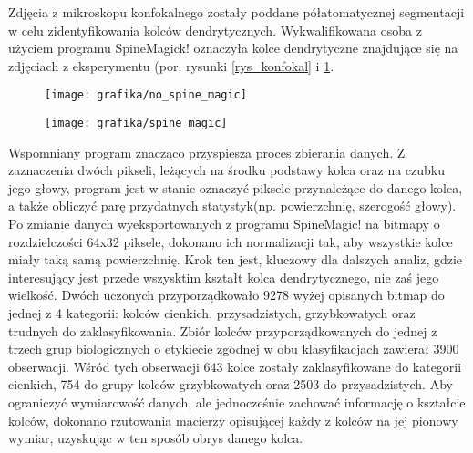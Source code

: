 \documentclass{article}
\begin{document}
Zdjęcia z mikroskopu konfokalnego zostały poddane półatomatycznej segmentacji w celu zidentyfikowania kolców dendrytycznych. 
Wykwalifikowana osoba z użyciem programu SpineMagick! oznaczyła kolce dendrytyczne znajdujące się na zdjęciach z eksperymentu (por. rysunki \ref{rys_konfokal} i \ref{rys_spine_magick}.
\begin{figure}
\centering
\begin{minipage}{.4\textwidth}
  \centering
  \texttt{[image: grafika/no\_spine\_magic]}
  \label{rys_konfokal}
\end{minipage}%
\hspace{1cm}
\begin{minipage}{.4\textwidth}
  \centering
  \texttt{[image: grafika/spine\_magic]}
  \label{rys_spine_magick}
\end{minipage}
\end{figure}
Wspomniany program znacząco przyspiesza proces zbierania danych.
Z zaznaczenia dwóch pikseli, leżących na środku podstawy kolca oraz na czubku jego głowy, program jest w stanie oznaczyć piksele przynależące do danego kolca, a także obliczyć parę przydatnych statystyk(np. powierzchnię, szerogość głowy).
Po zmianie danych wyeksportowanych z programu SpineMagic! na bitmapy o rozdzielczości 64x32 piksele, dokonano ich normalizacji tak, aby wszystkie kolce miały taką samą powierzchnię.
Krok ten jest, kluczowy dla dalszych analiz, gdzie interesujący jest przede wszysktim kształt kolca dendrytycznego, nie zaś jego wielkość.
Dwóch uczonych przyporządkowało 9278 wyżej opisanych bitmap do jednej z 4 kategorii: kolców cienkich, przysadzistych, grzybkowatych oraz trudnych do zaklasyfikowania.
Zbiór kolców przyporządkowanych do jednej z trzech grup biologicznych o etykiecie zgodnej w obu klasyfikacjach zawierał 3900 obserwacji.
Wśród tych obserwacji 643 kolce zostały zaklasyfikowane do kategorii cienkich, 754 do grupy kolców grzybkowatych oraz 2503 do przysadzistych.
Aby ograniczyć wymiarowość danych, ale jednocześnie zachować informację o kształcie kolców, dokonano rzutowania macierzy opisującej każdy z kolców na jej pionowy wymiar, uzyskując w ten sposób obrys danego kolca.
\end{document}
